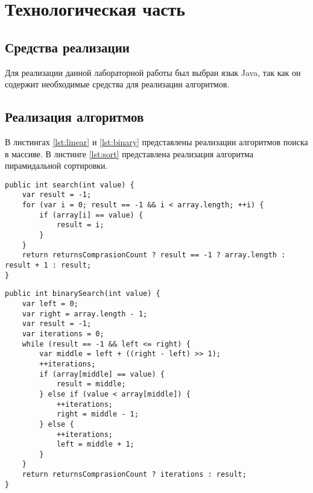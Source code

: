 \chapter{Технологическая часть}

\section{Средства реализации}

Для реализации данной лабораторной работы был выбран язык Java, так как он содержит необходимые средства для реализации алгоритмов. 

\section{Реализация алгоритмов}

В листингах \ref{lst:linear} и \ref{lst:binary} представлены реализации алгоритмов поиска в массиве. В листинге \ref{lst:sort} представлена реализация алгоритма пирамидальной сортировки.

\begin{lstlisting}[label=lst:linear,caption=Алгоритм линейного поиска в массиве]
public int search(int value) {
	var result = -1;
	for (var i = 0; result == -1 && i < array.length; ++i) {
		if (array[i] == value) {
			result = i;
		}
	}
	return returnsComprasionCount ? result == -1 ? array.length : result + 1 : result;
}
\end{lstlisting}

\begin{lstlisting}[label=lst:binary,caption=Алгоритм бинарного поиска в массиве]
public int binarySearch(int value) {
	var left = 0;
	var right = array.length - 1;
	var result = -1;
	var iterations = 0;
	while (result == -1 && left <= right) {
		var middle = left + ((right - left) >> 1);
		++iterations;
		if (array[middle] == value) {
			result = middle;
		} else if (value < array[middle]) {
			++iterations;
			right = middle - 1;
		} else {
			++iterations;
			left = middle + 1;
		}
	}
	return returnsComprasionCount ? iterations : result;
}
\end{lstlisting}

